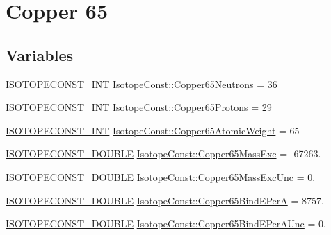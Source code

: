 \hypertarget{group___isotope_const-_copper-_cu65}{}\section{Copper 65}
\label{group___isotope_const-_copper-_cu65}
\subsection*{Variables}
\begin{DoxyCompactItemize}
\item 
\mbox{\hyperlink{group___isotope_const-_macros_ga5f18360b3e99483a35c32d789e62621c}{I\+S\+O\+T\+O\+P\+E\+C\+O\+N\+S\+T\+\_\+\+I\+NT}} \mbox{\hyperlink{group___isotope_const-_copper-_cu65_ga87db931d6c2cf9d4a0d20be1825667e6}{Isotope\+Const\+::\+Copper65\+Neutrons}} = 36
\item 
\mbox{\hyperlink{group___isotope_const-_macros_ga5f18360b3e99483a35c32d789e62621c}{I\+S\+O\+T\+O\+P\+E\+C\+O\+N\+S\+T\+\_\+\+I\+NT}} \mbox{\hyperlink{group___isotope_const-_copper-_cu65_gaf2254b7167f55c2e73ba981f3b352287}{Isotope\+Const\+::\+Copper65\+Protons}} = 29
\item 
\mbox{\hyperlink{group___isotope_const-_macros_ga5f18360b3e99483a35c32d789e62621c}{I\+S\+O\+T\+O\+P\+E\+C\+O\+N\+S\+T\+\_\+\+I\+NT}} \mbox{\hyperlink{group___isotope_const-_copper-_cu65_gab8a97a7313f5ccb7137c4716821877f7}{Isotope\+Const\+::\+Copper65\+Atomic\+Weight}} = 65
\item 
\mbox{\hyperlink{group___isotope_const-_macros_ga8f45a7272ce02c0b4c65c44636ed719a}{I\+S\+O\+T\+O\+P\+E\+C\+O\+N\+S\+T\+\_\+\+D\+O\+U\+B\+LE}} \mbox{\hyperlink{group___isotope_const-_copper-_cu65_gac3b151029b0b54df2eb55a08b4fbdcb5}{Isotope\+Const\+::\+Copper65\+Mass\+Exc}} = -\/67263.
\item 
\mbox{\hyperlink{group___isotope_const-_macros_ga8f45a7272ce02c0b4c65c44636ed719a}{I\+S\+O\+T\+O\+P\+E\+C\+O\+N\+S\+T\+\_\+\+D\+O\+U\+B\+LE}} \mbox{\hyperlink{group___isotope_const-_copper-_cu65_gae64abbbf083c9da12b296c2ca3e65e32}{Isotope\+Const\+::\+Copper65\+Mass\+Exc\+Unc}} = 0.
\item 
\mbox{\hyperlink{group___isotope_const-_macros_ga8f45a7272ce02c0b4c65c44636ed719a}{I\+S\+O\+T\+O\+P\+E\+C\+O\+N\+S\+T\+\_\+\+D\+O\+U\+B\+LE}} \mbox{\hyperlink{group___isotope_const-_copper-_cu65_ga8aff13bcbe3025b6817814dd6f2ea591}{Isotope\+Const\+::\+Copper65\+Bind\+E\+PerA}} = 8757.
\item 
\mbox{\hyperlink{group___isotope_const-_macros_ga8f45a7272ce02c0b4c65c44636ed719a}{I\+S\+O\+T\+O\+P\+E\+C\+O\+N\+S\+T\+\_\+\+D\+O\+U\+B\+LE}} \mbox{\hyperlink{group___isotope_const-_copper-_cu65_ga029ac84a3de4e75cac61d2688385cf93}{Isotope\+Const\+::\+Copper65\+Bind\+E\+Per\+A\+Unc}} = 0.

\end{DoxyCompactItemize}

